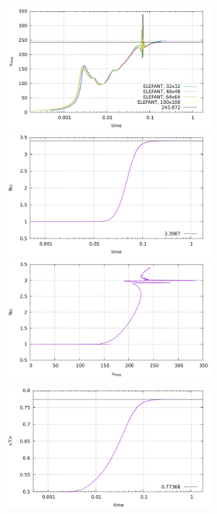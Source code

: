 \begin{center}
\includegraphics[width=7.8cm]{python_codes/fieldstone_28/results_case1/vrms.pdf}
\includegraphics[width=7.8cm]{python_codes/fieldstone_28/results_case1/Nu.pdf}\\
\includegraphics[width=7.8cm]{python_codes/fieldstone_28/results_case1/vrms_Nu.pdf}
\includegraphics[width=7.8cm]{python_codes/fieldstone_28/results_case1/Tavrg.pdf}
\end{center}

